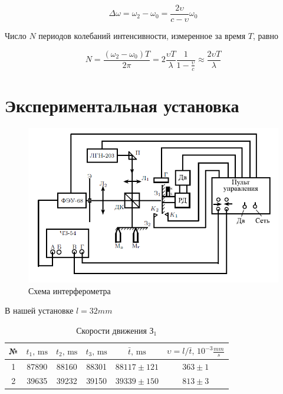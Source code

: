 \documentclass[a4paper,12pt]{article}
\begin{document}
	\begin{equation}\label{eq:Delta_omega}
	\Delta \omega = \omega_2 - \omega_0 = \frac{2\upsilon}{c-\upsilon}\omega_0
	\end{equation}
	
	Число $N$ периодов колебаний интенсивности,  измеренное за время $T$, равно
	
	\begin{equation}\label{eq:N_rel}
	N = \frac{(\omega_2 - \omega_0)T}{2\pi} = 2\frac{\upsilon T}{\lambda}\frac{1}{1 - \frac{\upsilon}{c}} \approx \frac{2\upsilon T}{\lambda}
	\end{equation}  
	
	\section{Экспериментальная установка}
	
	\begin{figure}[h!]\label{fig:scheme}
		\begin{center}
			\includegraphics[width = \linewidth]{scheme}
			\caption{Схема интерферометра}
		\end{center}
	\end{figure}
	
	В нашей установке $l = 32 mm$
	
	\begin{table}[h!]\label{tab:speed}
		\centering
		\caption{Скорости движения $\text{З}_1$}
		\begin{tabular}{|c|c|c|c|c|c|}
			\hline
			№ & $t_1 \text{, ms}$ & $t_2 \text{, ms}$ & $t_3 \text{, ms}$ & $ \bar{t}  \text{, ms}$ & $\upsilon = l/\bar{t} \text{, } 10^{-3}\frac{mm}{s}$ \\ \hline
			1 & 87890 & 88160 & 88301 & $88117 \pm 121$ & $363\pm1$ \\ \hline
			2 & 39635 & 39232 & 39150 & $39339 \pm 150$ & $813\pm3$ \\ \hline
		\end{tabular}
	\end{table}
	
\end{document}
